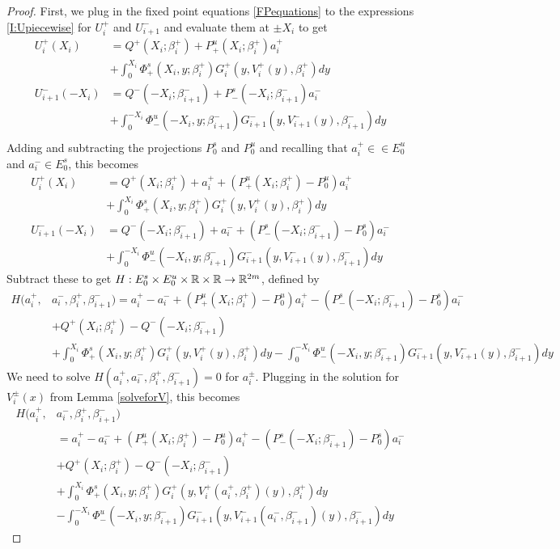 \documentclass[thesis.tex]{subfiles}
\begin{document}
\begin{lemma}
\begin{proof}
First, we plug in the fixed point equations \eqref{FPequations} to the expressions \eqref{I:Upiecewise} for $U_i^+$ and $U_{i+1}^-$ and evaluate them at $\pm X_i$ to get
\begin{align*}
U_i^+(X_i) &= Q^+(X_i; \beta_i^+) + P^u_+(X_i; \beta_i^+) a_i^+ \\
&+ \int_0^{X_i} \Phi_+^s(X_i, y; \beta_i^+) G_i^+(y, V_i^+(y),\beta_i^+)dy \\ 
U_{i+1}^-(-X_i) &= Q^-(-X_i; \beta_{i+1}^-) + P^s_-(-X_i; \beta_{i+1}^-) a_i^- \\
&+ \int_0^{-X_i} \Phi_-^u(-X_i, y; \beta_{i+1}^-) G_{i+1}^-(y, V_{i+1}^-(y),\beta_{i+1}^-)dy \\
\end{align*}
Adding and subtracting the projections $P_0^s$ and $P_0^u$ and recalling that $a_i^+ \in \in E_0^u$ and $a_i^- \in E_0^s$, this becomes
\begin{align*}
U_i^+(X_i) &= Q^+(X_i; \beta_i^+) + a_i^+ + (P^u_+(X_i; \beta_i^+) -  P^u_0)a_i^+ \\
&+ \int_0^{X_i} \Phi_+^s(X_i, y; \beta_i^+) G_i^+(y, V_i^+(y),\beta_i^+)dy \\ 
U_{i+1}^-(-X_i) &= Q^-(-X_i; \beta_{i+1}^-) + a_i^- + (P^s_-(-X_i; \beta_{i+1}^-) - P^s_0) a_i^- \\ 
&+ \int_0^{-X_i} \Phi_-^u(-X_i, y; \beta_{i+1}^-) G_{i+1}^-(y, V_{i+1}^-(y),\beta_{i+1}^-)dy
\end{align*}
Subtract these to get $H: E_0^s \times E_0^u \times {\mathbb R} \times {\mathbb R} \rightarrow {\mathbb R}^{2m}$, defined by
\begin{align*}
H(a_i^+, &a_i^-, \beta_i^+, \beta_{i+1}^-) 
= a_i^+ - a_i^- + (P^u_+(X_i; \beta_i^+) -  P^u_0)a_i^+ - (P^s_-(-X_i; \beta_{i+1}^-) - P^s_0) a_i^-  \\
&+ Q^+(X_i; \beta_i^+) - Q^-(-X_i; \beta_{i+1}^-)\\
&+ \int_0^{X_i} \Phi_+^s(X_i, y; \beta_i^+) G_i^+(y, V_i^+(y),\beta_i^+)dy
- \int_0^{-X_i} \Phi_-^u(-X_i, y; \beta_{i+1}^-) G_{i+1}^-(y, V_{i+1}^-(y),\beta_{i+1}^-)dy 
\end{align*}
We need to solve $H(a_i^+, a_i^-, \beta_i^+, \beta_{i+1}^-) = 0$ for $a_i^\pm$. Plugging in the solution for $V_i^\pm(x)$ from Lemma \ref{solveforV}, this becomes
\begin{align*}
H(a_i^+, &a_i^-, \beta_i^+, \beta_{i+1}^-) \\
&= a_i^+ - a_i^- + (P^u_+(X_i; \beta_i^+) -  P^u_0)a_i^+ - (P^s_-(-X_i; \beta_{i+1}^-) - P^s_0) a_i^-  \\
&+ Q^+(X_i; \beta_i^+) - Q^-(-X_i; \beta_{i+1}^-) \\
&+ \int_0^{X_i} \Phi_+^s(X_i, y; \beta_i^+) G_i^+(y, V_i^+(a_i^+, \beta_i^+)(y),\beta_i^+)dy \\
&- \int_0^{-X_i} \Phi_-^u(-X_i, y; \beta_{i+1}^-) G_{i+1}^-(y, V_{i+1}^-(a_i^-, \beta_{i+1}^-)(y),\beta_{i+1}^-)dy 
\end{align*}


\end{proof}
\end{lemma}
\end{document}

